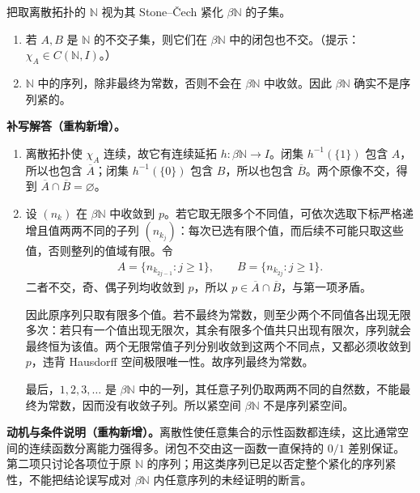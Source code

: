 \documentclass[../../main.tex]{subfiles}
\begin{document}
\begin{exercise}\label{exercise:ch04-stone-cech-integers}
把取离散拓扑的 $\mathbb N$ 视为其 Stone--Čech 紧化 $\beta\mathbb N$ 的子集。
\begin{enumerate}
\item\label{item:ch04-stone-cech-disjoint-closures} 若 $A,B$ 是 $\mathbb N$ 的不交子集，则它们在 $\beta\mathbb N$ 中的闭包也不交。（提示：$\chi_A\in C(\mathbb N,I)$。）
\item\label{item:ch04-stone-cech-no-nonconstant-sequence} $\mathbb N$ 中的序列，除非最终为常数，否则不会在 $\beta\mathbb N$ 中收敛。因此 $\beta\mathbb N$ 确实不是序列紧的。
\end{enumerate}
\end{exercise}
\begin{solution}
\textbf{补写解答（重构新增）。}
\begin{enumerate}
\item 离散拓扑使 $\chi_A$ 连续，故它有连续延拓 $h:\beta\mathbb N\to I$。闭集 $h^{-1}(\{1\})$ 包含 $A$，所以也包含 $\overline A$；闭集 $h^{-1}(\{0\})$ 包含 $B$，所以也包含 $\overline B$。两个原像不交，得到 $\overline A\cap\overline B=\varnothing$。
\item 设 $(n_k)$ 在 $\beta\mathbb N$ 中收敛到 $p$。若它取无限多个不同值，可依次选取下标严格递增且值两两不同的子列 $(n_{k_j})$：每次已选有限个值，而后续不可能只取这些值，否则整列的值域有限。令
\begin{align*}
A=\{n_{k_{2j-1}}:j\ge1\},\qquad
B=\{n_{k_{2j}}:j\ge1\}.
\end{align*}
二者不交，奇、偶子列均收敛到 $p$，所以 $p\in\overline A\cap\overline B$，与第一项矛盾。

因此原序列只取有限多个值。若不最终为常数，则至少两个不同值各出现无限多次：若只有一个值出现无限次，其余有限多个值共只出现有限次，序列就会最终恒为该值。两个无限常值子列分别收敛到这两个不同点，又都必须收敛到 $p$，违背 Hausdorff 空间极限唯一性。故序列最终为常数。

最后，$1,2,3,\ldots$ 是 $\beta\mathbb N$ 中的一列，其任意子列仍取两两不同的自然数，不能最终为常数，因而没有收敛子列。所以紧空间 $\beta\mathbb N$ 不是序列紧空间。
\end{enumerate}
\end{solution}
\begin{remark}
\textbf{动机与条件说明（重构新增）。}离散性使任意集合的示性函数都连续，这比通常空间的连续函数分离能力强得多。闭包不交由这一函数一直保持的 $0/1$ 差别保证。第二项只讨论各项位于原 $\mathbb N$ 的序列；用这类序列已足以否定整个紧化的序列紧性，不能把结论误写成对 $\beta\mathbb N$ 内任意序列的未经证明的断言。
\end{remark}
\end{document}
